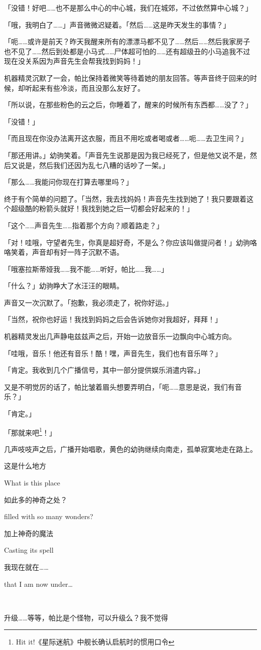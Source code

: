 「没错！好吧……也不是那么中心的中心城，我们在城郊，不过依然算中心城？」

「哦，我明白了……」声音微微迟疑着。「然后……这是昨天发生的事情？」

「呃……或许是前天？昨天我醒来所有的漂漂马都不见了……然后……然后我家房子也不见了……然后到处都是小马式……尸体超可怕的……还有超级丑的小马追我不过现在没关系因为声音先生会帮我找到妈妈！」

机器精灵沉默了一会，帕比保持着微笑等待着她的朋友回答。等声音终于回来的时候，却听起来有些冷淡，而且没那么友好了。

「所以说，在那些粉色的云之后，你睡着了，醒来的时候所有东西都……没了？」

「没错！」

「而且现在你没办法离开这衣服，而且不用吃或者喝或者……呃……去卫生间？」

「那还用讲。」幼驹笑着。「声音先生说那是因为我已经死了，但是他又说不是，然后又说是，然后我们还因为乱七八糟的话吵了一架。」

「那么……我能问你现在打算去哪里吗？」

终于有个简单的问题了。「当然，我去找妈妈！声音先生找到她了！我只要跟着这个超级酷的粉箭头就好！我找到她之后一切都会好起来的！」

「这个……声音先生……指着那个方向？顺着路走？」

「对！哇哦，守望者先生，你真是超好奇，不是么？你应该叫做提问者！」幼驹咯咯笑着，声音却有好一阵子沉默不语。

「哦塞拉斯蒂娅我……我不能……听好，帕比……我……」

「什么？」幼驹睁大了水汪汪的眼睛。

声音又一次沉默了。「抱歉，我必须走了，祝你好运。」

「当然，祝你也好运！我找到妈妈之后会告诉她你对我超好，拜拜！」

机器精灵发出几声静电兹兹声之后，开始一边放音乐一边飘向中心城方向。

「哇哦，音乐！他还有音乐！酷！嘿，声音先生，我们也有音乐咩？」

「{\mt 肯定。我收到几个广播信号，其中一部分提供娱乐消遣内容。}」

又是不明觉厉的话了，帕比皱着眉头想要弄明白，「呃……意思是说，我们有音乐？」

「{\mt 肯定。}」

「那就来吧\footnote{Hit it!《星际迷航》中舰长确认启航时的惯用口令}！」

几声吱吱声之后，广播开始唱歌，黄色的幼驹继续向南走，孤单寂寞地走在路上。

\begin{song}
这是什么地方

What is this place

\medskip

如此多的神奇之处？

filled with so many wonders?

\medskip

加上神奇的魔法

Casting its spell

\medskip

我现在就在……

that I am now under\dots
\end{song}


~\vfill

\begin{note}
    升级……等等，帕比是个怪物，可以升级么？我不觉得
\end{note}



